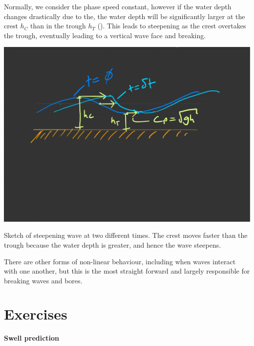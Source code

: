 Normally, we consider the phase speed constant, however if the water depth changes drastically due to the, the water depth will be significantly larger at the crest $h_C$ than in the trough $h_T$ ().  This leads to steepening as the crest overtakes the trough, eventually leading to a vertical wave face and breaking.  

\begin{marginfigure}
    \includegraphics{figs/Waves/SketchNonLinearWave}
    \caption{Sketch of steepening wave at two different times.  The crest moves faster than the trough because the water depth is greater, and hence the wave steepens.}
    \label{fig:SketchNonLinearWave} 
\end{marginfigure}

There are other forms of non-linear behaviour, including when waves interact with one another, but this is the most straight forward and largely responsible for breaking waves and bores.  

\section{Exercises}

\paragraph{Swell prediction}

